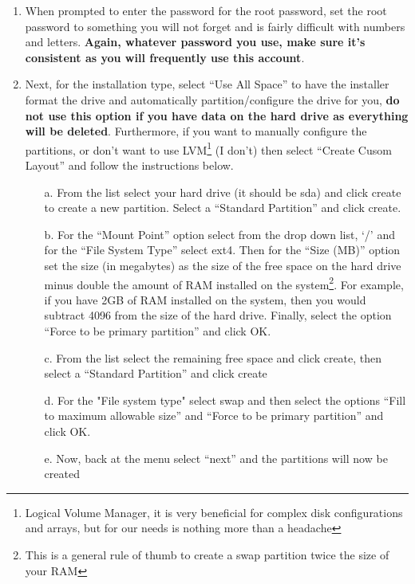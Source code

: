 \begin{enumerate}
\item	When prompted to enter the password for the root password, set the root password to something you will not forget and is fairly
		difficult with numbers and letters. {\bf Again, whatever password you use,  make sure it's consistent as you will frequently
		use this account}.
		
\item	Next, for the installation type, select ``Use All Space'' to have the installer format the drive and automatically partition/configure
		the drive for you, {\bf do not use this option if you have data on the hard drive as everything will be deleted}. Furthermore, if you
		want to manually configure the partitions, or don't want to use LVM\footnote{Logical Volume Manager, it is very beneficial for complex
		disk configurations and arrays, but for our needs is nothing more than a headache} (I don't) then select ``Create Cusom Layout''
		and follow the instructions below.
		
\begin{itemize}
\label{sec:rhmanualdrive}
\item[a.]	From the list select your hard drive (it should be sda) and click create to create a new partition. Select a ``Standard Partition''
			and click create.

\item[b.]	For the ``Mount Point'' option select from the drop down list, `/' and for the ``File System Type'' select ext4. Then for the 
			``Size (MB)'' option set the size (in megabytes) as the size of the free space on the hard drive minus double the amount of RAM 
			installed on the system\footnote{This is a general rule of thumb to create a swap partition twice the size of your RAM}. For 
			example, if you	have 2GB of RAM installed on the system, then you would subtract 4096 from the size of the hard drive. 
			Finally, select the option ``Force to be primary partition'' and click OK.

\item[c.]	From the list select the remaining free space and click create, then select a ``Standard Partition'' and click create

\item[d.]	For the "File system type" select swap and then select the options ``Fill to maximum allowable size'' and ``Force to be primary
			partition'' and click OK.
			
\item[e.]	Now, back at the menu select ``next'' and the partitions will now be created
\end{itemize}


\end{enumerate}
